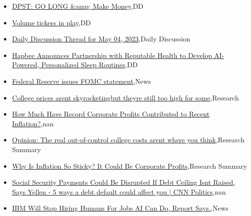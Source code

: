 \documentclass{article}%
\begin{document}
%
\begin{itemize}%
\item%
\href{https://reddit.com/r/wallstreetbets/comments/137ivem/dpst\_go\_long\_make\_money/}{DPST: GO LONG \&amp; Make Money},DD%
\item%
\href{https://reddit.com/r/wallstreetbets/comments/137ibro/volume\_tickers\_in\_play/}{Volume tickers in play},DD%
\item%
\href{https://reddit.com/r/wallstreetbets/comments/137g0v8/daily\_discussion\_thread\_for\_may\_04\_2023/}{Daily Discussion Thread for May 04, 2023},Daily Discussion%
\item%
\href{https://reddit.com/r/Baystreetbets/comments/137gnl8/hapbee\_announces\_partnership\_with\_reputable/}{Hapbee Announces Partnership with Reputable Health to Develop AI-Powered, Personalized Sleep Routines},DD%
\item%
\href{https://reddit.com/r/Economics/comments/136ux36/federal\_reserve\_issues\_fomc\_statement/}{Federal Reserve issues FOMC statement},News%
\item%
\href{https://reddit.com/r/Economics/comments/136ta2w/college\_prices\_arent\_skyrocketingbut\_theyre\_still/}{College prices arent skyrocketingbut theyre still too high for some},Research%
\item%
\href{https://reddit.com/r/Economics/comments/136lpd2/how\_much\_have\_record\_corporate\_profits/}{How Much Have Record Corporate Profits Contributed to Recent Inflation?},nan%
\item%
\href{https://reddit.com/r/Economics/comments/136jsoi/opinion\_the\_real\_outofcontrol\_college\_costs\_arent/}{Opinion: The real out-of-control college costs arent where you think},Research Summary%
\item%
\href{https://reddit.com/r/Economics/comments/1368hgr/why\_is\_inflation\_so\_sticky\_it\_could\_be\_corporate/}{Why Is Inflation So Sticky? It Could Be Corporate Profits},Research Summary%
\item%
\href{https://reddit.com/r/Economics/comments/13673cc/social\_security\_payments\_could\_be\_disrupted\_if/}{Social Security Payments Could Be Disrupted If Debt Ceiling Isnt Raised, Says Yellen - 5 ways a debt default could affect you | CNN Politics},nan%
\item%
\href{https://reddit.com/r/Economics/comments/1366whi/ibm\_will\_stop\_hiring\_humans\_for\_jobs\_ai\_can\_do/}{IBM Will Stop Hiring Humans For Jobs AI Can Do, Report Says.},News%
\end{itemize}%
\end{document}
